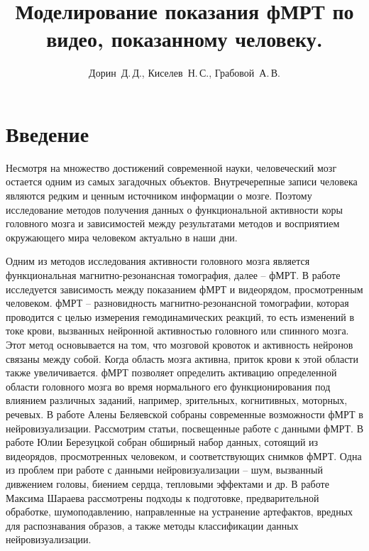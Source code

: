 \documentclass[12pt,twoside]{article}
\title
    [Моделирование показания фМРТ по видео, показанному человеку] %
    {Моделирование показания фМРТ по видео, показанному человеку.}
\author
    [Дорин~Д.\,Д.] %
    {Дорин~Д.\,Д., Киселев~Н.\,С., Грабовой~А.\,В.} %
    [Дорин~Д.\,Д.$^{1,2}$, Киселев~Н.\,С.$^{1,2}$, Грабовой~А.\,В.$^2$] %
\begin{document}
\maketitle
\section{Введение}
Несмотря на множество достижений современной науки, человеческий мозг остается одним из самых загадочных объектов. 
Внутречерепные записи человека являются редким и ценным источником информации о мозге.
Поэтому исследование методов получения данных о функциональной активности коры 
головного мозга и зависимостей между результатами методов и восприятием окружающего мира человеком актуально в наши дни.

Одним из методов исследования активности головного мозга является функциональная магнитно-резонансная томография, далее -- фМРТ.
В работе исследуется зависимость между показанием фМРТ и видеорядом, просмотренным человеком.
фМРТ -- разновидность магнитно-резонансной томографии, которая проводится с целью измерения гемодинамических реакций, то есть 
изменений в токе крови, вызванных нейронной активностью головного или спинного мозга.
Этот метод основывается на том, что мозговой кровоток и активность нейронов связаны между собой. Когда область мозга активна, 
приток крови к этой области также увеличивается. 
фМРТ позволяет определить активацию определенной области головного мозга во время нормального его функционирования под 
влиянием различных заданий, например, зрительных, когнитивных,  моторных,  речевых.
В работе Алены Беляевской \citep{Belyaevskaya2018} собраны современные возможности фМРТ в нейровизуализации.
Рассмотрим статьи, посвещенные работе с данными фМРТ.
В работе Юлии Березуцкой \citep{Berezutskaya2022} собран обширный набор данных, сотоящий из видеорядов, просмотренных 
человеком, и соответствующих снимков фМРТ. Одна из проблем при работе с данными нейровизуализации -- шум, вызванный 
дивжением головы, биением сердца, тепловыми эффектами и др. 
В работе Максима Шараева \citep{https://doi.org/10.48550/arxiv.1804.10167} рассмотрены подходы к подготовке,
предварительной обработке, шумоподавлению, направленные на устранение артефактов, вредных 
для распознавания образов, а также методы классификации данных нейровизуализации.
\end{document}
